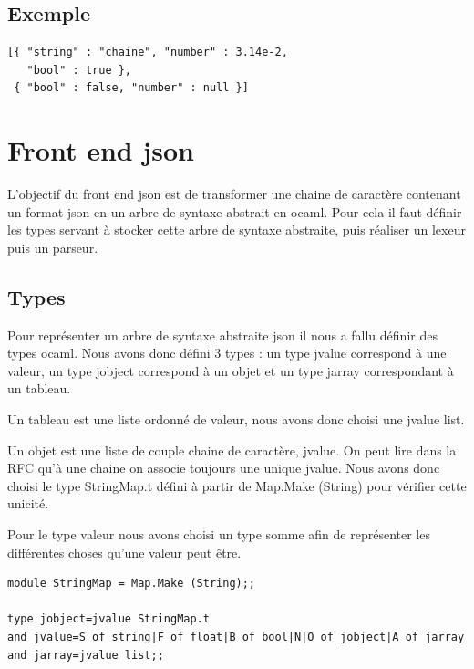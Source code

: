 \documentclass{report}
\begin{document}
\section{Exemple}
\begin{verbatim}
[{ "string" : "chaine", "number" : 3.14e-2, 
   "bool" : true },
 { "bool" : false, "number" : null }]
\end{verbatim}



\chapter{Front end json}
L'objectif du front end json est de transformer une chaine de caractère contenant un format json en un arbre de syntaxe abstrait en ocaml. Pour cela il faut définir les types servant à stocker cette arbre de syntaxe abstraite, puis réaliser un lexeur puis un parseur.
\section{Types}
\par
Pour représenter un arbre de syntaxe abstraite json il nous a fallu définir des types ocaml. Nous avons donc défini 3 types : un type jvalue correspond à une valeur, un type jobject correspond à un objet et un type jarray correspondant à un tableau.
\par
Un tableau est une liste ordonné de valeur, nous avons donc choisi une jvalue list.
\par
Un objet est une liste de couple chaine de caractère, jvalue. On peut lire dans la RFC qu'à une chaine on associe toujours une unique jvalue. Nous avons donc choisi le type StringMap.t défini à partir de Map.Make (String) pour vérifier cette unicité.
\par
Pour le type valeur nous avons choisi un type somme afin de représenter les différentes choses qu'une valeur peut être.
\par
\begin{verbatim}
module StringMap = Map.Make (String);;

type jobject=jvalue StringMap.t
and jvalue=S of string|F of float|B of bool|N|O of jobject|A of jarray
and jarray=jvalue list;;
\end{verbatim}
\end{document}
